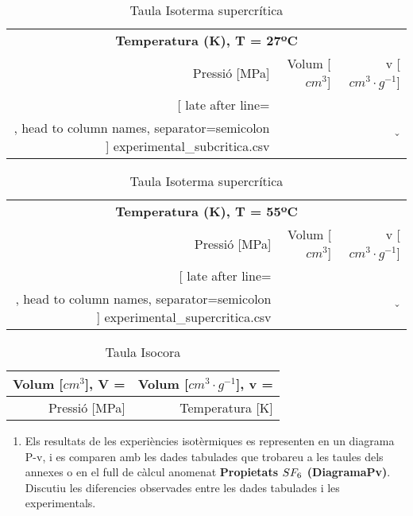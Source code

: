 \documentclass[a4paper]{article}
\begin{document}
\begin{table}[H]
	\begin{minipage}[t][8,3cm][b]{0.49\linewidth}
		\begin{tabular}{rrr}
			\multicolumn{3}{c}{\bf Temperatura (K), T = 27ºC} \\
			Pressió [MPa] & Volum [$cm^3$] & v [$cm^3 · g^{-1}$] \\
			\hline
			\csvreader[
					late after line=\\, 
					head to column names, separator=semicolon
				]
				{experimental_subcritica.csv}{}{\P & \V & \v }
		\end{tabular}
		\vfill
		\caption{Taula Isoterma subcrítica}	
	\end{minipage}
	\begin{minipage}[t][8,3cm][b]{0.49\linewidth}
		\begin{tabular}{rrr}
			\multicolumn{3}{c}{\bf Temperatura (K), T = 55ºC} \\
			Pressió [MPa] & Volum [$cm^3$] & v [$cm^3 · g^{-1}$] \\
			\hline
			\csvreader[
					late after line=\\, 
					head to column names, separator=semicolon
				]
				{experimental_supercritica.csv}{}{\P & \V & \v }
		\end{tabular}
		\vfill
		\caption{Taula Isoterma supercrítica}
	\end{minipage}
\end{table}

\begin{table}[H]
	\centering
	\begin{tabular}{rr}
		\textbf{Volum [$cm^3$], V = } & \textbf{Volum [$cm^3 · g^{-1}$], v = } \\
		\hline
		Pressió [MPa] & Temperatura [K] \\
	\end{tabular}
	\caption{Taula Isocora}
\end{table}

\begin{enumerate}[resume]
	\item Els resultats de les experiències isotèrmiques es representen en un diagrama P-v, i es comparen amb les dades tabulades que trobareu a les taules dels annexes o en el full de càlcul anomenat \textbf{Propietats $\boldmath SF_6$ (DiagramaPv)}. Discutiu les diferencies observades entre les dades tabulades i les experimentals.
\end{enumerate}
\end{document}
